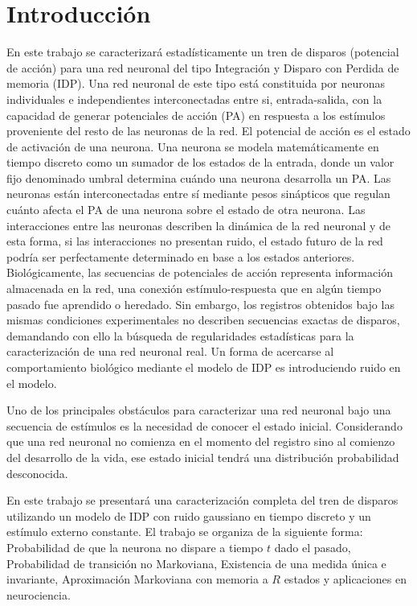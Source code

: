 \section{Introducción}
En este trabajo se caracterizará estadísticamente un tren de disparos (potencial de acción) para una red neuronal del tipo Integración y Disparo con Perdida de memoria (IDP). Una red neuronal de este tipo está constituida por neuronas individuales e independientes interconectadas entre si, entrada-salida, con la capacidad de generar potenciales de acción (PA) en respuesta a los estímulos proveniente del resto de las neuronas de la red. El potencial de acción es el estado de activación de una neurona. Una neurona se modela matemáticamente en tiempo discreto como un sumador de los estados de la entrada, donde un valor fijo denominado umbral determina cuándo una neurona desarrolla un PA. Las neuronas están interconectadas entre sí mediante pesos sinápticos que regulan cuánto afecta el PA de una neurona sobre el estado de otra neurona. 
Las interacciones entre las neuronas describen la dinámica de la red neuronal y de esta forma, si las interacciones no presentan ruido, el estado futuro de la red podría ser perfectamente determinado en base a los estados anteriores. Biológicamente, las secuencias de potenciales de acción representa información almacenada en la red, una conexión estímulo-respuesta que en algún tiempo pasado fue aprendido o heredado. Sin embargo, los registros obtenidos bajo las mismas condiciones experimentales no describen secuencias exactas de disparos, demandando con ello la búsqueda de regularidades estadísticas para la caracterización de una red neuronal real. Un forma de acercarse al comportamiento biológico mediante el modelo de IDP es introduciendo ruido en el modelo. 

Uno de los principales obstáculos para caracterizar una red neuronal bajo una secuencia de estímulos es la necesidad de conocer el estado inicial. Considerando que una red neuronal no comienza en el momento del registro sino al comienzo del desarrollo de la vida, ese estado inicial tendrá una distribución probabilidad desconocida.

En este trabajo se presentará una caracterización completa del tren de disparos utilizando un modelo de IDP con ruido gaussiano en tiempo discreto y un estímulo externo constante. El trabajo se organiza de la siguiente forma: Probabilidad de que la neurona no dispare a tiempo $t$ dado el pasado, Probabilidad de transición no Markoviana, Existencia de una medida única e invariante, Aproximación Markoviana con memoria a $R$ estados y aplicaciones en neurociencia. 